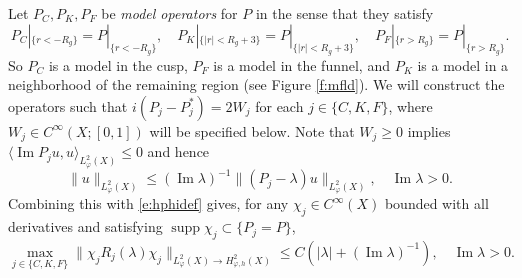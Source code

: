 \documentclass[reqno, 12pt]{amsart}
\newcommand \R {\mathbb{R}}
\newcommand \la {\langle}
\newcommand \ra {\rangle}
\DeclareMathOperator \im {Im}
\DeclareMathOperator \supp {supp}
\theoremstyle{definition}
\numberwithin{equation}{section}
\numberwithin{prop}{section}
\numberwithin{figure}{section}
\begin{document}
Let $P_C, P_K, P_F$ be \textit{model operators} for $P$ in the sense that they satisfy
\[
P_C|_{\{r < - R_g\}} = P|_{\{r < - R_g \}}, \quad P_K|_{\{|r| <  R_g + 3\}} = P|_{\{|r| <  R_g + 3\}}, \quad P_F|_{\{r > R_g\}} = P|_{\{r >  R_g\}}.
\]
So $P_C$ is a model in the cusp, $P_F$ is a model in the funnel, and $P_K$ is a model in a neighborhood of the remaining region (see Figure \ref{f:mfld}). %
We will construct the operators such that  $i(P_j  - P_j^*)= 2W_j$ for each $j \in \{C,K,F\}$, where $W_j \in C^\infty(X;[0,1])$ will be specified below. Note that  $W_j \ge 0$ implies $ \la \im P_j u, u \ra_{L^2_\varphi(X)} \le 0$ and hence
\[
 \|u\|_{L^2_\varphi(X)} \le (\im \lambda)^{-1} \|(P_j - \lambda)u\|_{L^2_\varphi(X)}, \quad \im \lambda > 0.
\]
Combining this with \eqref{e:hphidef} gives, for any $\chi_j \in C^\infty(X)$  bounded with all derivatives and satisfying $\supp \chi_j \subset \{P_j = P\}$,
\begin{equation}\label{e:modelboundj0}
\max_{j \in \{C,K,F\}}\|\chi _j R_j(\lambda) \chi_j \|_{L^2_\varphi(X) \to H^2_{\varphi,h}(X)} \le C(|\lambda| + (\im \lambda)^{-1}),  \quad \im \lambda > 0.
\end{equation}
\end{document}

